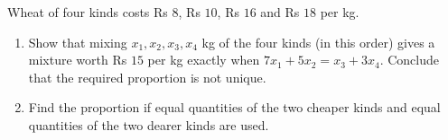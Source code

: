 Wheat of four kinds costs Rs $8$, Rs $10$, Rs $16$ and Rs $18$ per kg.
\begin{enumerate}
\item[(a)] Show that mixing $x_1,x_2,x_3,x_4$ kg of the four kinds (in this order) gives a mixture worth Rs $15$ per kg exactly when $7x_1+5x_2=x_3+3x_4$. Conclude that the required proportion is not unique.
\item[(b)] Find the proportion if equal quantities of the two cheaper kinds and equal quantities of the two dearer kinds are used.
\end{enumerate}
